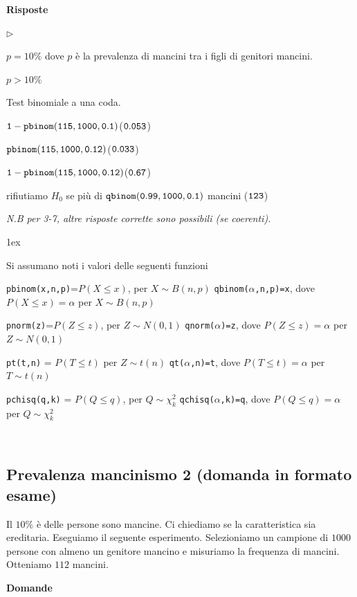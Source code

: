 \documentclass[12pt,openany]{book}
\newcommand{\mylabel}[1]{{\footnotesize\textsf{#1}}\hfill}
\renewenvironment{itemize}
  {\begin{list}{$\triangleright$}{%
   \setlength{\parskip}{0mm}
   \setlength{\topsep}{.2\baselineskip}
   \setlength{\rightmargin}{0mm}
   \setlength{\listparindent}{0mm}
   \setlength{\itemindent}{0mm}
   \setlength{\labelwidth}{3ex}
   \setlength{\itemsep}{.4\baselineskip}
   \setlength{\parsep}{0mm}
   \setlength{\partopsep}{0mm}
   \setlength{\labelsep}{1ex}
   \setlength{\leftmargin}{\labelwidth+\labelsep}
   \let\makelabel\mylabel}}{%
   \end{list}\vspace*{-1.3mm}}
\theoremstyle{mio}
\theoremstyle{liscio}
\begin{document}
\textbf{Risposte}

\begin{itemize}
\item[1.] $p=10\%$ dove $p$ è la prevalenza di mancini tra i figli di genitori mancini.
\item[2.]  $p>10\%$ 
\item[3.] Test binomiale a una coda.
\item[4.]  $\tt 1 - pbinom(115,1000,0.1)$\hfill ($\tt 0.053$)
\item[5.]  $\tt pbinom(115,1000,0.12)$\hfill ($\tt 0.033$)
\item[6.]  $\tt 1- pbinom(115,1000,0.12)$\hfill ($\tt 0.67$)
\item[7.]  rifiutiamo $H_0$ se più di $\tt qbinom(0.99,1000,0.1)$ mancini \hfill ($\tt 123$) 
\end{itemize}

\textit{N.B per 3-7, altre risposte corrette sono possibili (se coerenti).}

\parskip1ex
{\hrulefill\scriptsize

Si assumano noti i valori delle seguenti funzioni

{\tt pbinom(x,n,p)}=$P(X\le x)$, per $X\sim B(n,p)$
\hfill 
{\tt qbinom($\alpha$,n,p)=x},  dove $P(X\le x)=\alpha$ per $X\sim B(n,p)$

{\tt pnorm(z)}=$P(Z\le z)$, per $Z\sim N(0,1)$
\hfill 
{\tt qnorm($\alpha$)=z},  dove $P(Z\le z)=\alpha$ per $Z\sim N(0,1)$

{\tt pt(t,n)} = $P(T\le t)$ per $Z\sim t(n)$
\hfill
{\tt qt($\alpha$,n)=t}, dove $P(T\le t)=\alpha$ per $T\sim t(n)$

{\tt pchisq(q,k)} = $P(Q\le q)$, per $Q\sim \chi^2_k$
\hfill
{\tt qchisq($\alpha$,k)=q},  dove $P(Q\le q)=\alpha$ per $Q\sim \chi^2_k$
\par
}

\hfill{}\clearpage\
\subsection{Prevalenza mancinismo 2 (domanda in formato esame)}

Il $10\%$ è delle persone sono mancine. Ci chiediamo se la caratteristica sia ereditaria. Eseguiamo il seguente esperimento. Selezioniamo un campione di $1000$ persone con almeno un genitore mancino e misuriamo la frequenza di mancini. Otteniamo $112$ mancini. 

\textbf{Domande}
\end{document}

